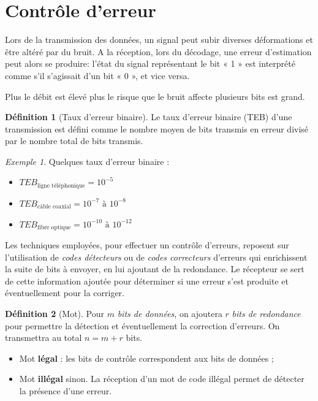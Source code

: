 \documentclass[11pt,english,french]{scrreprt}
\theoremstyle{remark}
\newtheorem*{ex*}{Exemple}
\theoremstyle{definition}
\newtheorem*{def*}{Définition}
\begin{document}
\section{Contrôle d'erreur} %

Lors de la transmission des données, un signal peut subir diverses déformations et être altéré par du bruit. A la réception, lors du décodage, une erreur d'estimation peut alors se produire: l'état du signal représentant le bit « 1 » est interprété comme s'il s'agissait d'un bit « 0 », et vice versa.

Plus le débit est élevé plus le risque que le bruit affecte plusieurs bits est grand.

\begin{def*}[Taux d'erreur binaire]
	Le taux d'erreur binaire (TEB) d'une transmission est défini comme le nombre moyen de bits transmis en erreur divisé par le nombre total de bits transmis.
\end{def*}

\begin{ex*}
	Quelques taux d'erreur binaire :\begin{itemize}
		\item $TEB_{\textrm{ligne téléphonique}}=10^{-5}$
		\item $TEB_{\textrm{câble coaxial}}=10^{-7}\textrm{ à }10^{-8}$
		\item $TEB_{\textrm{fibre optique}}=10^{-10}\textrm{ à }10^{-12}$
	\end{itemize}
\end{ex*}


Les techniques employées, pour effectuer un contrôle d'erreurs, reposent sur l'utilisation de \emph{codes détecteurs} ou de \emph{codes correcteurs} d'erreurs qui enrichissent la suite de bits à envoyer, en lui ajoutant de la redondance. Le récepteur se sert de cette information ajoutée pour déterminer si une erreur s'est produite et éventuellement pour la corriger.

\begin{def*}[Mot]
	Pour $m$ \emph{bits de données}, on ajoutera $r$ \emph{bits de redondance} pour permettre la détection et éventuellement la correction d'erreurs. On transmettra au total $n = m + r$ bits.
	\begin{itemize}
		\item Mot \textbf{légal} : les bits de contrôle correspondent aux bits de données ;
		\item Mot \textbf{illégal} sinon. La réception d'un mot de code illégal permet de détecter la présence d'une erreur.
	\end{itemize}
\end{def*}
\end{document}
